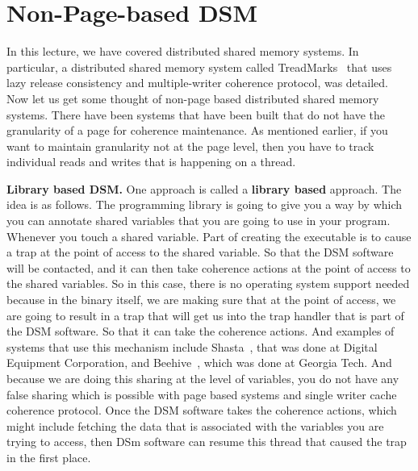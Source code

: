 \documentclass[11pt]{lecture}
\begin{document}
\section{Non-Page-based DSM}\label{sec: np-dsm}

In this lecture, we have covered distributed shared memory systems. In particular, a distributed shared 
memory system called TreadMarks~\cite{Amza1996DSM} that uses lazy release consistency and multiple-writer 
coherence protocol, was detailed. 
Now let us get some thought of non-page based distributed shared memory systems. There have been systems 
that have been built that do not have the granularity of a page for coherence maintenance. As mentioned 
earlier, if you want to maintain granularity not at the page level, then you have to track individual 
reads and writes that is happening on a thread. 

\noindent
{\bf Library based DSM.} One approach is called a {\bf library based } approach. The idea is as follows. 
The programming library is going to give you a way by which you can annotate shared variables that 
you are going to use in your program. Whenever you touch a shared variable. Part of creating the executable 
is to cause a trap at the point of access to the shared variable. So that the DSM software will be 
contacted, and it can then take coherence actions at the point of access to the shared variables. 
So in this case, there is no operating system support needed because in the binary itself, we are 
making sure that at the point of access, we are going to result in a trap that will get us into the trap handler 
that is part of the DSM software. So that it can take the coherence actions. And examples of 
systems that use this mechanism include Shasta~\cite{shasta}, that was done at Digital Equipment 
Corporation, and Beehive~\cite{beehive}, which was done at Georgia Tech. And because we are doing this sharing 
at the level of variables, you do not have any false sharing which is possible with page based 
systems and single writer cache coherence protocol. Once the DSM software takes the coherence actions, which might 
include fetching the data that is associated with the variables you are trying to access, then 
DSm software can resume this thread that caused the trap in the first place.
\end{document}
